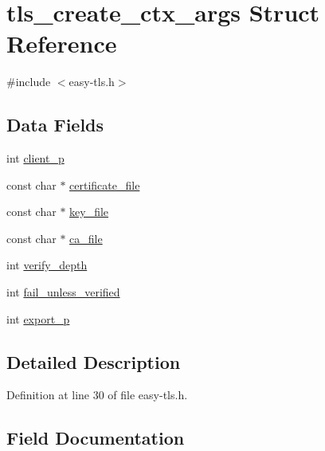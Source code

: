 \hypertarget{structtls__create__ctx__args}{}\section{tls\+\_\+create\+\_\+ctx\+\_\+args Struct Reference}
\label{structtls__create__ctx__args}


{\ttfamily \#include $<$easy-\/tls.\+h$>$}

\subsection*{Data Fields}
\begin{DoxyCompactItemize}
\item 
int \hyperlink{structtls__create__ctx__args_ab34c46dc01ec481d13f7bfad0044e34c}{client\+\_\+p}
\item 
const char $\ast$ \hyperlink{structtls__create__ctx__args_abb52464f1543ae9b0370495d3c5b55a9}{certificate\+\_\+file}
\item 
const char $\ast$ \hyperlink{structtls__create__ctx__args_abacc2c434f2dc536289e3a0efeebd342}{key\+\_\+file}
\item 
const char $\ast$ \hyperlink{structtls__create__ctx__args_a7749c8ed6eb55594d82faa720394b69b}{ca\+\_\+file}
\item 
int \hyperlink{structtls__create__ctx__args_af960941c08b45889252b28b3dac628c7}{verify\+\_\+depth}
\item 
int \hyperlink{structtls__create__ctx__args_ac471c7fd0fe54495c620cc11c77c98dc}{fail\+\_\+unless\+\_\+verified}
\item 
int \hyperlink{structtls__create__ctx__args_a77e8199c15cedf9e2414a6905b608aa7}{export\+\_\+p}
\end{DoxyCompactItemize}


\subsection{Detailed Description}


Definition at line 30 of file easy-\/tls.\+h.



\subsection{Field Documentation}
